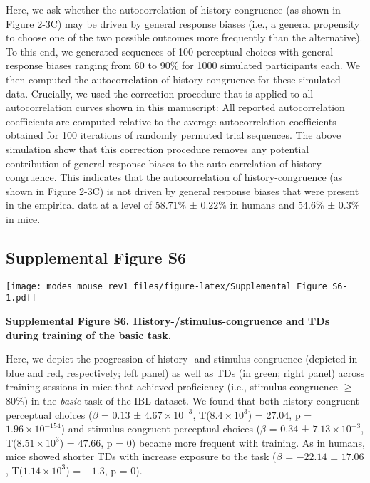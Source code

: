 \documentclass[
]{article}
\begin{document}
Here, we ask whether the autocorrelation of history-congruence (as shown
in Figure 2-3C) may be driven by general response biases (i.e., a
general propensity to choose one of the two possible outcomes more
frequently than the alternative). To this end, we generated sequences of
100 perceptual choices with general response biases ranging from 60 to
90\% for 1000 simulated participants each. We then computed the
autocorrelation of history-congruence for these simulated data.
Crucially, we used the correction procedure that is applied to all
autocorrelation curves shown in this manuscript: All reported
autocorrelation coefficients are computed relative to the average
autocorrelation coefficients obtained for 100 iterations of randomly
permuted trial sequences. The above simulation show that this correction
procedure removes any potential contribution of general response biases
to the auto-correlation of history-congruence. This indicates that the
autocorrelation of history-congruence (as shown in Figure 2-3C) is not
driven by general response biases that were present in the empirical
data at a level of 58.71\% ± 0.22\% in humans and 54.6\% ± 0.3\% in
mice.

\newpage

\hypertarget{supplemental-figure-s6}{%
\subsection{Supplemental Figure S6}\label{supplemental-figure-s6}}

\texttt{[image: modes\_mouse\_rev1\_files/figure-latex/Supplemental\_Figure\_S6-1.pdf]}

\textbf{Supplemental Figure S6. History-/stimulus-congruence and TDs
during training of the basic task.}

Here, we depict the progression of history- and stimulus-congruence
(depicted in blue and red, respectively; left panel) as well as TDs (in
green; right panel) across training sessions in mice that achieved
proficiency (i.e., stimulus-congruence \(\geq\) 80\%) in the
\emph{basic} task of the IBL dataset. We found that both
history-congruent perceptual choices (\(\beta\) = \(0.13\) ±
\(\ensuremath{4.67\times 10^{-3}}\),
T(\(\ensuremath{8.4\times 10^{3}}\)) = \(27.04\), p =
\(\ensuremath{1.96\times 10^{-154}}\)) and stimulus-congruent perceptual
choices (\(\beta\) = \(0.34\) ± \(\ensuremath{7.13\times 10^{-3}}\),
T(\(\ensuremath{8.51\times 10^{3}}\)) = \(47.66\), p = \(0\)) became
more frequent with training. As in humans, mice showed shorter TDs with
increase exposure to the task (\(\beta\) = \(-22.14\) ± \(17.06\),
T(\(\ensuremath{1.14\times 10^{3}}\)) = \(-1.3\), p = \(0\)).
\end{document}

